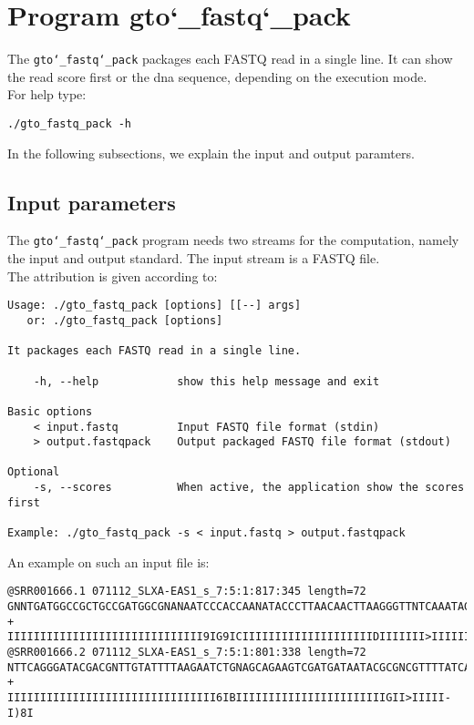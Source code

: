 \section{Program gto\char`_fastq\char`_pack}
The \texttt{gto\char`_fastq\char`_pack} packages each FASTQ read in a single line. It can show the read score first or the dna sequence, depending on the execution mode. \\
For help type:
\begin{lstlisting}
./gto_fastq_pack -h
\end{lstlisting}
In the following subsections, we explain the input and output paramters.

\subsection*{Input parameters}

The \texttt{gto\char`_fastq\char`_pack} program needs two streams for the computation, namely the input and output standard. The input stream is a FASTQ file.\\
The attribution is given according to:
\begin{lstlisting}
Usage: ./gto_fastq_pack [options] [[--] args]
   or: ./gto_fastq_pack [options]

It packages each FASTQ read in a single line.

    -h, --help            show this help message and exit

Basic options
    < input.fastq         Input FASTQ file format (stdin)
    > output.fastqpack    Output packaged FASTQ file format (stdout)

Optional
    -s, --scores          When active, the application show the scores first

Example: ./gto_fastq_pack -s < input.fastq > output.fastqpack
\end{lstlisting}
An example on such an input file is:
\begin{lstlisting}
@SRR001666.1 071112_SLXA-EAS1_s_7:5:1:817:345 length=72
GNNTGATGGCCGCTGCCGATGGCGNANAATCCCACCAANATACCCTTAACAACTTAAGGGTTNTCAAATAGA
+
IIIIIIIIIIIIIIIIIIIIIIIIIIIIII9IG9ICIIIIIIIIIIIIIIIIIIIIDIIIIIII>IIIIII/
@SRR001666.2 071112_SLXA-EAS1_s_7:5:1:801:338 length=72
NTTCAGGGATACGACGNTTGTATTTTAAGAATCTGNAGCAGAAGTCGATGATAATACGCGNCGTTTTATCAN
+
IIIIIIIIIIIIIIIIIIIIIIIIIIIIIIII6IBIIIIIIIIIIIIIIIIIIIIIIIGII>IIIII-I)8I
\end{lstlisting}

